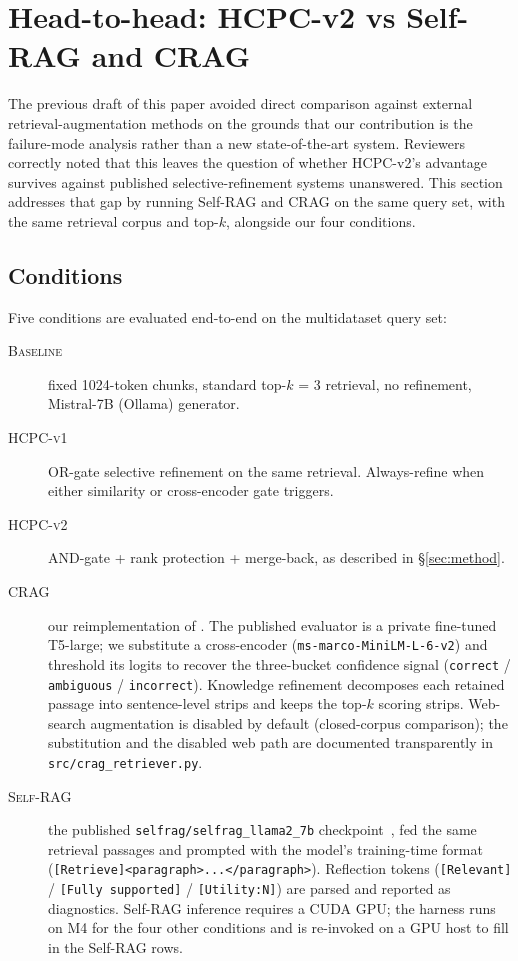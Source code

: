 \section{Head-to-head: HCPC-v2 vs Self-RAG and CRAG}
\label{sec:headtohead}

The previous draft of this paper avoided direct comparison against
external retrieval-augmentation methods on the grounds that our
contribution is the failure-mode analysis rather than a new
state-of-the-art system. Reviewers correctly noted that this leaves the
question of whether HCPC-v2's advantage survives against published
selective-refinement systems unanswered. This section addresses that gap
by running Self-RAG and CRAG on the same query set, with the same
retrieval corpus and top-$k$, alongside our four conditions.

\subsection{Conditions}

Five conditions are evaluated end-to-end on the multidataset query set:

\begin{description}
  \item[\textsc{Baseline}] fixed 1024-token chunks, standard top-$k$ = 3
        retrieval, no refinement, Mistral-7B (Ollama) generator.
  \item[\textsc{HCPC-v1}] OR-gate selective refinement on the same
        retrieval. Always-refine when either similarity or cross-encoder
        gate triggers.
  \item[\textsc{HCPC-v2}] AND-gate + rank protection + merge-back, as
        described in §\ref{sec:method}.
  \item[\textsc{CRAG}] our reimplementation of \citet{yan2024crag}. The
        published evaluator is a private fine-tuned T5-large; we
        substitute a cross-encoder
        (\texttt{ms-marco-MiniLM-L-6-v2}) and threshold its logits to
        recover the three-bucket confidence signal (\texttt{correct} /
        \texttt{ambiguous} / \texttt{incorrect}). Knowledge refinement
        decomposes each retained passage into sentence-level strips and
        keeps the top-$k$ scoring strips. Web-search augmentation is
        disabled by default (closed-corpus comparison); the substitution
        and the disabled web path are documented transparently in
        \texttt{src/crag\_retriever.py}.
  \item[\textsc{Self-RAG}] the published
        \texttt{selfrag/selfrag\_llama2\_7b}
        checkpoint~\citep{asai2024selfrag}, fed the same retrieval
        passages and prompted with the model's training-time format
        (\texttt{[Retrieve]<paragraph>...</paragraph>}). Reflection
        tokens (\texttt{[Relevant]} / \texttt{[Fully supported]} /
        \texttt{[Utility:N]}) are parsed and reported as diagnostics.
        Self-RAG inference requires a CUDA GPU; the harness runs on M4
        for the four other conditions and is re-invoked on a GPU host to
        fill in the Self-RAG rows.
\end{description}

